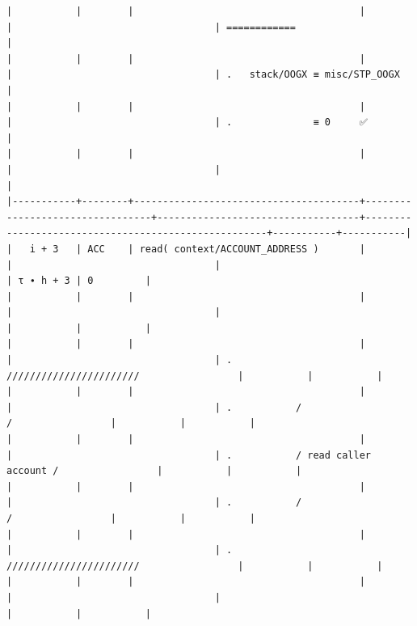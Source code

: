 \documentclass[varwidth=\maxdimen,margin=0.5cm,multi={verbatim}]{standalone}
\begin{document}
\begin{verbatim}
|           |        |                                       |                                 |                                   | ============                                        |
|           |        |                                       |                                 |                                   | .   stack/OOGX ≡ misc/STP_OOGX                      |
|           |        |                                       |                                 |                                   | .              ≡ 0     ✅                           |
|           |        |                                       |                                 |                                   |                                                     |
|-----------+--------+---------------------------------------+---------------------------------+-----------------------------------+-----------------------------------------------------+-----------+-----------|
|   i + 3   | ACC    | read( context/ACCOUNT_ADDRESS )       |                                 |                                   |                                                     | τ ∙ h + 3 | 0         |
|           |        |                                       |                                 |                                   |                                                     |           |           |
|           |        |                                       |                                 |                                   | .           ///////////////////////                 |           |           |
|           |        |                                       |                                 |                                   | .           /                     /                 |           |           |
|           |        |                                       |                                 |                                   | .           / read caller account /                 |           |           |
|           |        |                                       |                                 |                                   | .           /                     /                 |           |           |
|           |        |                                       |                                 |                                   | .           ///////////////////////                 |           |           |
|           |        |                                       |                                 |                                   |                                                     |           |           |

\end{verbatim}
\end{document}
